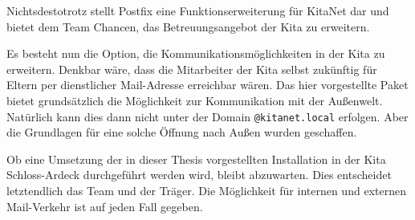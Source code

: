 Nichtsdestotrotz stellt Postfix eine Funktionserweiterung für KitaNet dar und bietet dem Team Chancen, das Betreuungsangebot der Kita zu erweitern.

Es besteht nun die Option, die Kommunikationsmöglichkeiten in der Kita zu erweitern. 
Denkbar wäre, dass die Mitarbeiter der Kita selbst zukünftig für Eltern per dienstlicher Mail-Adresse erreichbar wären. 
Das hier vorgestellte Paket bietet grundsätzlich die Möglichkeit zur Kommunikation mit der Außenwelt.
Natürlich kann dies dann nicht unter der Domain \verb+@kitanet.local+ erfolgen. 
Aber die Grundlagen für eine solche Öffnung nach Außen wurden geschaffen.

Ob eine Umsetzung der in dieser Thesis vorgestellten Installation in der Kita Schloss-Ardeck durchgeführt werden wird, bleibt abzuwarten.
Dies entscheidet letztendlich das Team und der Träger. Die Möglichkeit für internen und externen Mail-Verkehr ist auf jeden Fall gegeben.
